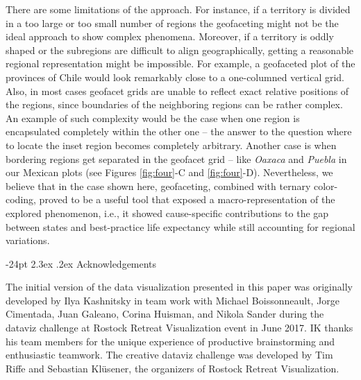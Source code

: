 \documentclass[10pt, twoside, parskip=half]{article}
\makeatletter
\renewcommand\section{\@startsection {section}{1}{\z@}%
                                   {-24pt}%
                                   {2.3ex \@plus.2ex}%
                                   {\normalfont\large\bfseries}}
\makeatother
\begin{document}
There are some limitations of the approach. For instance, if a territory is divided in a too large or too small number of regions the geofaceting might not be the ideal approach to show complex phenomena. Moreover, if a territory is oddly shaped or the subregions are difficult to align geographically, getting a reasonable regional representation might be impossible. For example, a geofaceted plot of the provinces of Chile would look remarkably close to a one-columned vertical grid. Also, in most cases geofacet grids are unable to reflect exact relative positions of the regions, since boundaries of the neighboring regions can be rather complex. An example of such complexity would be the case when one region is encapsulated completely within the other one -- the answer to the question where to locate the inset region becomes completely arbitrary. Another case is when bordering regions get separated in the geofacet grid -- like \emph{Oaxaca} and \emph{Puebla} in our Mexican plots (see Figures \ref{fig:four}-C and \ref{fig:four}-D). Nevertheless, we believe that in the case shown here, geofaceting, combined with ternary color-coding, proved to be a useful tool that exposed a macro-representation of the explored phenomenon, i.e., it showed cause-specific contributions to the gap between states and best-practice life expectancy while still accounting for regional variations.

\hypertarget{acknowledgements}{%
\section{Acknowledgements}\label{acknowledgements}}

The initial version of the data visualization presented in this paper was originally developed by Ilya Kashnitsky in team work with Michael Boissonneault, Jorge Cimentada, Juan Galeano, Corina Huisman, and Nikola Sander during the dataviz challenge at Rostock Retreat Visualization event in June 2017. IK thanks his team members for the unique experience of productive brainstorming and enthusiastic teamwork. The creative dataviz challenge was developed by Tim Riffe and Sebastian Klüsener, the organizers of Rostock Retreat Visualization.

\clearpage

\newpage


\end{document}
